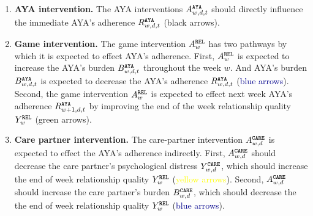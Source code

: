 \begin{enumerate}
\item \textbf{AYA intervention.} The AYA interventions $A_{w,d,t}^{\tiny\texttt{AYA}}$ should directly influence the immediate AYA's adherence $R_{w,d,t}^{\tiny\texttt{AYA}}$ (black arrows). 


\item \textbf{Game intervention.} The game intervention $A_{w}^{\tiny\texttt{REL}}$ has two pathways by which it is expected to effect  AYA's adherence. First, $A_{w}^{\tiny\texttt{REL}}$ is expected to increase the AYA's burden $B_{w,d,t}^{\tiny\texttt{AYA}}$ throughout the week $w$.  And AYA's burden $B_{w,d,t}^{\tiny\texttt{AYA}}$ is expected to decrease the AYA's adherence $R_{w,d,t}^{\tiny\texttt{AYA}}$ (\textcolor{darkblue}{blue arrows}). Second, the game intervention $A_{w}^{\tiny\texttt{REL}}$ is expected to effect   next week AYA's adherence $R_{w+1,d,t}^{\tiny\texttt{AYA}}$ by improving the end of the week relationship quality $Y_{w}^{\tiny\texttt{REL}}$ (\textcolor{grassgreen}{green arrows}). 



\item 
\textbf{Care partner intervention.} The care-partner intervention $A_{w,d}^{\tiny\texttt{CARE}}$ is expected to effect the AYA's adherence indirectly. First, $A_{w,d}^{\tiny\texttt{CARE}}$ should decrease the care partner's psychological distress $Y_{w,d}^{\tiny\texttt{CARE}}$, which should increase the end of week relationship quality $Y_{w}^{\tiny\texttt{REL}}$ (\textcolor{yellow}{yellow arrows}). Second, $A_{w,d}^{\tiny\texttt{CARE}}$ should increase the care partner's burden $B_{w,d}^{\tiny\texttt{CARE}}$, which should decrease the the end of week relationship quality $Y_{w}^{\tiny\texttt{REL}}$ (\textcolor{darkblue}{blue arrows}). 

\end{enumerate}

